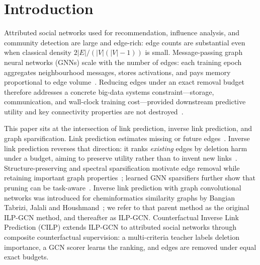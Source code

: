 \section{Introduction}
\label{sec:intro}

Attributed social networks used for recommendation, influence analysis, and community detection are large and edge-rich: edge counts are substantial even when classical density $2|E|/(|V|(|V|-1))$ is small.
Message-passing graph neural networks (GNNs) scale with the number of edges: each training epoch aggregates neighbourhood messages, stores activations, and pays memory proportional to edge volume~\citep{kipf2017semi,rong2020dropedge}.
Reducing edges under an exact removal budget therefore addresses a concrete big-data systems constraint---storage, communication, and wall-clock training cost---provided downstream predictive utility and key connectivity properties are not destroyed~\citep{zheng2020neuralsparse,luo2021ptdnet,spielman2011graph}.

This paper sits at the intersection of link prediction, inverse link prediction, and graph sparsification.
Link prediction estimates missing or future edges~\citep{liben2007link,martinez2016survey}.
Inverse link prediction reverses that direction: it ranks \emph{existing} edges by deletion harm under a budget, aiming to preserve utility rather than to invent new links~\citep{bangian2025ilp}.
Structure-preserving and spectral sparsification motivate edge removal while retaining important graph properties~\citep{lindner2015structure,hamann2016structure,chen2024demystifying,feng2016spectral,spielman2011graph}; learned GNN sparsifiers further show that pruning can be task-aware~\citep{zheng2020neuralsparse,luo2021ptdnet,li2020sgcn}.
Inverse link prediction with graph convolutional networks was introduced for cheminformatics similarity graphs by Bangian Tabrizi, Jalali and Houshmand~\citep{bangian2025ilp}; we refer to that parent method as the original ILP-GCN method, and thereafter as ILP-GCN.
Counterfactual Inverse Link Prediction (CILP) extends ILP-GCN to attributed social networks through composite counterfactual supervision: a multi-criteria teacher labels deletion importance, a GCN scorer learns the ranking, and edges are removed under equal exact budgets.


